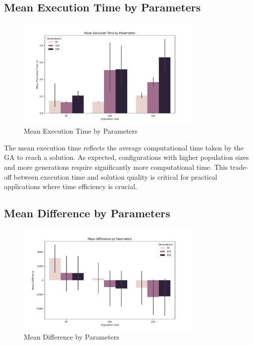 \documentclass[
]{article}
\begin{document}
    \subsection{Mean Execution Time by Parameters}\label{subsec:mean-execution-time-by-parameters}
    \begin{figure}[H]
        \centering
        \includegraphics[width=0.8\textwidth]{genetic_algorithm/mean_execution_time.png}
        \caption{Mean Execution Time by Parameters}
        \label{fig:mean_execution_time_ga}
    \end{figure}

    The mean execution time reflects the average computational time taken by the GA to reach a solution. As expected, configurations with higher population sizes and more generations require significantly more computational time. This trade-off between execution time and solution quality is critical for practical applications where time efficiency is crucial.

    \subsection{Mean Difference by Parameters}\label{subsec:mean-difference-by-parameters}
    \begin{figure}[H]
        \centering
        \includegraphics[width=0.8\textwidth]{genetic_algorithm/mean_difference.png}
        \caption{Mean Difference by Parameters}
        \label{fig:mean_difference_ga}
    \end{figure}
\end{document}
